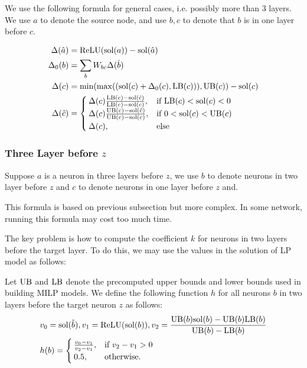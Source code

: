 
\iffalse
We use the following formula for general cases, i.e. possibly more than 3 layers. We use $a$ to denote the source node, and use $b,c$ to denote that $b$ is in one layer before $c$. 

\begin{align*}
	\Delta(\hat{a}) &= \mathrm{ReLU}(\mathrm{sol}(a))-\mathrm{sol}(\hat{a})\\
	\Delta_0(b) &= \sum_{b} W_{bc}\Delta(\hat{b})\\
		\Delta(c) &= \min(\max((\mathrm{sol}(c)+\Delta_0(c),\mathrm{LB}(c))),\mathrm{UB}(c))-\mathrm{sol}(c)\\
		\Delta(\hat{c}) &=
		\begin{cases}
		\Delta(c)\frac{\mathrm{LB}(c) - \mathrm{sol}(\hat{c})}{\mathrm{LB}(c) - \mathrm{sol}(c)},  &\text{if } \mathrm{LB}(c)< \mathrm{sol}(c) < 0\\
		\Delta(c)\frac{\mathrm{UB}(c) - \mathrm{sol}(\hat{c})}{\mathrm{UB}(c) - \mathrm{sol}(c)},  &\text{if }  0< \mathrm{sol}(c) < \mathrm{UB}(c)\\
			\Delta(c),  &\text{else } 	 
		\end{cases}
\end{align*}


\subsubsection*{Three Layer before  $z$} 

Suppose $a$ is a neuron in three layers before $z$, we use $b$ to denote neurons in two layer before $z$ and $c$ to denote neurons in one layer before $z$ and. 

This formula is based on previous subsection but more complex. In some network, running this formula may cost too much time. 

The key problem is how to compute the coefficient $k$ for neurons in two layers before the target layer. To do this, we may use the values in the solution of LP model as follows:

\begin{definition}\label{3layer}
Let $\mathrm{UB}$ and $\mathrm{LB}$ denote the precomputed upper bounds and lower bounds used in building MILP models. We define the following function $h$ for all neurons $b$ in two layers before the target neuron $z$ as follows:
	\begin{align}
		&v_0 = \mathrm{sol}(\hat{b}), v_1 = \mathrm{ReLU}(\mathrm{sol}(b)), v_2 = \frac{\mathrm{UB}(b)\mathrm{sol}(b)-\mathrm{UB}(b)\mathrm{LB}(b)}{\mathrm{UB}(b)-\mathrm{LB}(b)}\\
		&h(b) =
		\begin{cases}
			\frac{v_0-v_1}{v_2-v_1}, & \text{if } v_2-v_1 > 0\\
			0.5, & \text{otherwise.}
		\end{cases}
	\end{align} 
\end{definition} 

